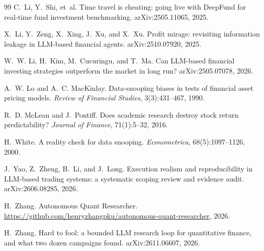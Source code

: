 \documentclass[11pt]{article}
\begin{document}
\begin{thebibliography}{99}
C.~Li, Y.~Shi, et~al.
\newblock Time travel is cheating: going live with DeepFund for real-time fund
investment benchmarking.
\newblock arXiv:2505.11065, 2025.

X.~Li, Y.~Zeng, X.~Xing, J.~Xu, and X.~Xu.
\newblock Profit mirage: revisiting information leakage in LLM-based financial
agents.
\newblock arXiv:2510.07920, 2025.

W.~W. Li, H.~Kim, M.~Cucuringu, and T.~Ma.
\newblock Can LLM-based financial investing strategies outperform the market in
long run?
\newblock arXiv:2505.07078, 2026.

A.~W. Lo and A.~C. MacKinlay.
\newblock Data-snooping biases in tests of financial asset pricing models.
\newblock \emph{Review of Financial Studies}, 3(3):431--467, 1990.

R.~D. McLean and J.~Pontiff.
\newblock Does academic research destroy stock return predictability?
\newblock \emph{Journal of Finance}, 71(1):5--32, 2016.

H.~White.
\newblock A reality check for data snooping.
\newblock \emph{Econometrica}, 68(5):1097--1126, 2000.

J.~Yao, Z.~Zheng, B.~Li, and J.~Long.
\newblock Execution realism and reproducibility in LLM-based trading systems: a
systematic scoping review and evidence audit.
\newblock arXiv:2606.08285, 2026.

H.~Zhang.
\newblock Autonomous Quant Researcher.
\newblock \url{https://github.com/henryzhangpku/autonomous-quant-researcher},
2026.

H.~Zhang.
\newblock Hard to fool: a bounded LLM research loop for quantitative finance,
and what two dozen campaigns found.
\newblock arXiv:2611.06607, 2026.

\end{thebibliography}
\end{document}
